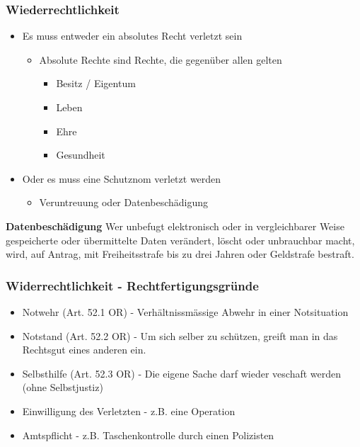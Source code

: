\hypertarget{wiederrechtlichkeit}{%
\subsubsection{Wiederrechtlichkeit}\label{wiederrechtlichkeit}}

\begin{itemize}
\tightlist
\item
  Es muss entweder ein absolutes Recht verletzt sein

  \begin{itemize}
  \tightlist
  \item
    Absolute Rechte sind Rechte, die gegenüber allen gelten

    \begin{itemize}
    \tightlist
    \item
      Besitz / Eigentum
    \item
      Leben
    \item
      Ehre
    \item
      Gesundheit
    \end{itemize}
  \end{itemize}
\item
  Oder es muss eine Schutznom verletzt werden

  \begin{itemize}
  \tightlist
  \item
    Veruntreuung oder Datenbeschädigung
  \end{itemize}
\end{itemize}

\textbf{Datenbeschädigung} Wer unbefugt elektronisch oder in
vergleichbarer Weise gespeicherte oder übermittelte Daten verändert,
löscht oder unbrauchbar macht, wird, auf Antrag, mit Freiheitsstrafe bis
zu drei Jahren oder Geldstrafe bestraft.

\hypertarget{widerrechtlichkeit---rechtfertigungsgruxfcnde}{%
\subsubsection{Widerrechtlichkeit -
Rechtfertigungsgründe}\label{widerrechtlichkeit---rechtfertigungsgruxfcnde}}

\begin{itemize}
\tightlist
\item
  Notwehr (Art. 52.1 OR) - Verhältnissmässige Abwehr in einer
  Notsituation
\item
  Notstand (Art. 52.2 OR) - Um sich selber zu schützen, greift man in
  das Rechtsgut eines anderen ein.
\item
  Selbsthilfe (Art. 52.3 OR) - Die eigene Sache darf wieder veschaft
  werden (ohne Selbstjustiz)
\item
  Einwilligung des Verletzten - z.B. eine Operation
\item
  Amtspflicht - z.B. Taschenkontrolle durch einen Polizisten
\end{itemize}

